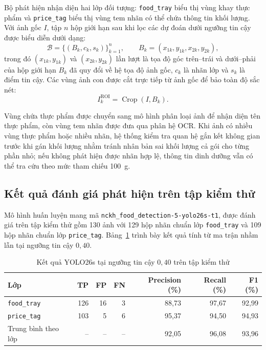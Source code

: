 Bộ phát hiện nhận diện hai lớp đối tượng: \texttt{food\_tray} biểu thị vùng khay thực phẩm và \texttt{price\_tag} biểu thị vùng tem nhãn có thể chứa thông tin khối lượng. Với ảnh gốc $I$, tập $n$ hộp giới hạn sau khi lọc các dự đoán dưới ngưỡng tin cậy được biểu diễn dưới dạng:
\begin{equation}
    \mathcal{B} = \{(B_k, c_k, s_k)\}_{k=1}^{n},
    \qquad B_k = (x_{1k}, y_{1k}, x_{2k}, y_{2k}),
    \label{eq:yolo-detections}
\end{equation}
trong đó $(x_{1k}, y_{1k})$ và $(x_{2k}, y_{2k})$ lần lượt là tọa độ góc trên--trái và dưới--phải của hộp giới hạn $B_k$ đã quy đổi về hệ tọa độ ảnh gốc, $c_k$ là nhãn lớp và $s_k$ là điểm tin cậy. Các vùng ảnh con được cắt trực tiếp từ ảnh gốc để bảo toàn độ sắc nét:
\begin{equation}
    I_k^{\mathrm{ROI}} = \operatorname{Crop}(I, B_k).
    \label{eq:yolo-crop}
\end{equation}

Vùng chứa thực phẩm được chuyển sang mô hình phân loại ảnh để nhận diện tên thực phẩm, còn vùng tem nhãn được đưa qua phân hệ OCR. Khi ảnh có nhiều vùng thực phẩm hoặc nhiều nhãn, hệ thống kiểm tra quan hệ gắn kết không gian trước khi gán khối lượng nhằm tránh nhân bản sai khối lượng cả gói cho từng phần nhỏ; nếu không phát hiện được nhãn hợp lệ, thông tin dinh dưỡng vẫn có thể tra cứu theo mức tham chiếu 100~g.

\subsection{Kết quả đánh giá phát hiện trên tập kiểm thử}
\label{subsec:yolo-experiment-results}

Mô hình huấn luyện mang mã \nolinkurl{nckh_food_detection-5-yolo26s-t1}, được đánh giá trên tập kiểm thử gồm 130 ảnh với 129 hộp nhãn chuẩn lớp \texttt{food\_tray} và 109 hộp nhãn chuẩn lớp \texttt{price\_tag}. Bảng~\ref{tab:yolo26s-test-metrics} trình bày kết quả tính từ ma trận nhầm lẫn tại ngưỡng tin cậy $0{,}40$.

\begin{table}[htbp]
    \centering
    \caption{Kết quả YOLO26s tại ngưỡng tin cậy $0{,}40$ trên tập kiểm thử}
    \label{tab:yolo26s-test-metrics}
    \begin{tabular}{@{}lrrrrrr@{}}
        \toprule
        Lớp & TP & FP & FN & Precision (\%) & Recall (\%) & F1 (\%) \\
        \midrule
        \texttt{food\_tray} & 126 & 16 & 3 & 88,73 & 97,67 & 92,99 \\
        \texttt{price\_tag} & 103 & 5 & 6 & 95,37 & 94,50 & 94,93 \\
        \midrule
        Trung bình theo lớp & -- & -- & -- & 92,05 & 96,08 & 93,96 \\
        \bottomrule
    \end{tabular}
\end{table}

